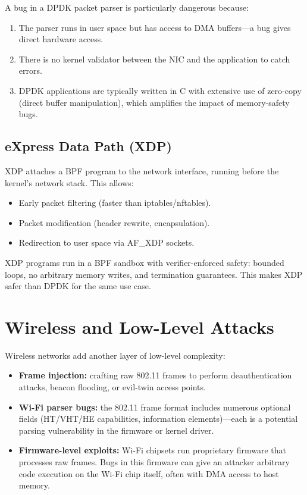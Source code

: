A bug in a DPDK packet parser is particularly dangerous because:

\begin{enumerate}
	\item The parser runs in user space but has access to DMA buffers---a bug gives direct hardware access.
	\item There is no kernel validator between the NIC and the application to catch errors.
	\item DPDK applications are typically written in C with extensive use of zero-copy (direct buffer manipulation), which amplifies the impact of memory-safety bugs.
\end{enumerate}

\subsection{eXpress Data Path (XDP)}

XDP attaches a BPF program to the network interface, running before the kernel's network stack. This allows:

\begin{itemize}
	\item Early packet filtering (faster than iptables/nftables).
	\item Packet modification (header rewrite, encapsulation).
	\item Redirection to user space via AF\_XDP sockets.
\end{itemize}

XDP programs run in a BPF sandbox with verifier-enforced safety: bounded loops, no arbitrary memory writes, and termination guarantees. This makes XDP safer than DPDK for the same use case.

\section{Wireless and Low-Level Attacks}

Wireless networks add another layer of low-level complexity:

\begin{itemize}
	\item \textbf{Frame injection:} crafting raw 802.11 frames to perform deauthentication attacks, beacon flooding, or evil-twin access points.
	\item \textbf{Wi-Fi parser bugs:} the 802.11 frame format includes numerous optional fields (HT/VHT/HE capabilities, information elements)---each is a potential parsing vulnerability in the firmware or kernel driver.
	\item \textbf{Firmware-level exploits:} Wi-Fi chipsets run proprietary firmware that processes raw frames. Bugs in this firmware can give an attacker arbitrary code execution on the Wi-Fi chip itself, often with DMA access to host memory.
\end{itemize}

